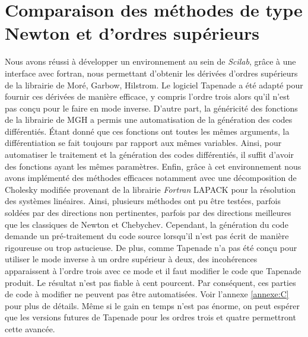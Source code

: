 \documentclass[caractereUtf,maitrise]{style/scienceUdeS}
\begin{document}
\modeFrancais{}
\chapter[Comparaison des m\'ethodes d'ordres sup\'erieurs] 
        {\singlespacing%
         Comparaison des m\'ethodes de type Newton et d'ordres sup\'erieurs}
         \label{ch:chapitre-5}

\modeFrancais{}
% 
\Conclusion

Nous avons r\'eussi \`a d\'evelopper un environnement au sein de {\it Scilab}, grâce \`a une interface avec 
fortran, nous permettant d'obtenir les d\'eriv\'ees d'ordres sup\'erieurs de la librairie de Mor\'e, Garbow, Hilstrom.
Le logiciel Tapenade a \'et\'e adapt\'e pour fournir ces d\'eriv\'ees de mani\`ere efficace, y compris l'ordre trois alors 
qu'il n'est pas conçu pour le faire en mode inverse.
D'autre part, la g\'en\'ericit\'e des fonctions de la librairie de MGH a permis une automatisation de la g\'en\'eration des codes 
diff\'erenti\'es. \'Etant donn\'e que ces fonctions ont toutes les mêmes arguments, la diff\'erentiation se fait toujours par rapport 
aux mêmes variables. Ainsi, pour automatiser le traitement et la g\'en\'eration des codes diff\'erenti\'es, il suffit
d'avoir des fonctions ayant les mêmes param\`etres.
Enfin, grâce \`a cet environnement nous avons impl\'ement\'e des m\'ethodes efficaces notamment avec 
une d\'ecomposition de Cholesky modifi\'ee
provenant de la librairie {\it Fortran} LAPACK pour la r\'esolution des syst\`emes lin\'eaires.
Ainsi, plusieurs m\'ethodes ont pu être test\'ees, parfois sold\'ees par des directions non pertinentes, parfois par des
directions meilleures que les classiques de Newton et Chebychev.
Cependant, la g\'en\'eration du code demande un pr\'e-traitement du code source lorsqu'il n'est pas \'ecrit de mani\`ere rigoureuse
 ou trop astucieuse. De plus, comme Tapenade n'a pas \'et\'e conçu pour utiliser le mode inverse \`a un ordre sup\'erieur \`a deux,
des incoh\'erences apparaissent \`a l'ordre trois avec ce mode et il faut modifier le code que Tapenade produit. Le r\'esultat n'est pas fiable 
\`a cent pourcent. Par cons\'equent, ces parties de code \`a modifier ne peuvent pas être automatis\'ees. Voir l'annexe \ref{annexe:C} pour plus de d\'etails.
 Même si le gain en temps n'est pas 
\'enorme, on peut esp\'erer que les versions futures de Tapenade pour les ordres trois et quatre permettront cette avanc\'ee.
\end{document}
